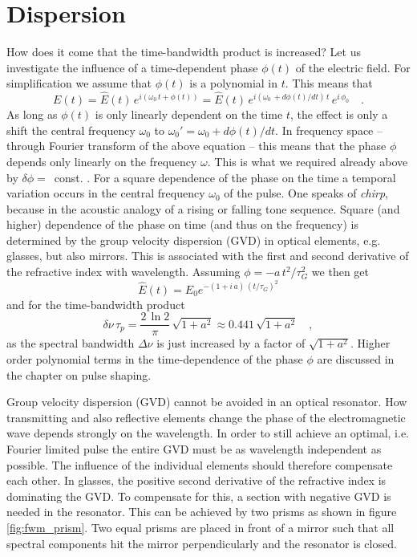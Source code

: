 \section{Dispersion}

How does it come that the time-bandwidth product is increased? 
Let us investigate the  influence of a time-dependent phase $\phi(t)$
of the electric field. For simplification we 
assume that $\phi(t)$ is a polynomial in $t$. This means that
\begin{equation}
  E(t) = \hat{E}(t) \, e^{i ( \omega_0 \, t + \phi(t))}
  = \hat{E}(t) \, e^{i ( \omega_0 \, + d\phi(t)/dt) \, t} \, e^{i
  \, \phi_0}  \quad . \label{eq:fwm_field_with_phase}
\end{equation}
As long as $\phi(t)$ is only linearly dependent on the time $t$, the effect is
 only a shift the central frequency $\omega_0$ to
$\omega_0' = \omega_0 + d\phi(t)/dt$.  In frequency space -- through
Fourier transform of the above equation --  this means that the
phase $\phi$ depends only linearly on the frequency $\omega$. This
is what we required already above by  
$\delta \phi =$~const. . For a square
dependence of the phase on the time a temporal variation occurs
in the central frequency $\omega_0$ of the pulse. One  speaks
of \emph{chirp}, because in the acoustic analogy of a
rising or falling tone sequence. Square
(and higher) dependence of the phase on time (and thus on
the frequency) is determined by the group velocity dispersion
(GVD) in optical elements,
e.g. glasses, but also mirrors. This is associated with the
first and second derivative of the refractive index with 
wavelength. Assuming $\phi = - a \,
t^2 / \tau_G^2$ we then get
\begin{equation}
  \hat{E}(t) = \hat{E}_0 e^{- (1 + i \, a) \, ( t / \tau_G ) ^2} \label{eq:fwm_chirp}
\end{equation}
and for the time-bandwidth product
\begin{equation}
  \delta \nu \, \tau_p = \frac{2 \, \ln 2}{\pi} \, \sqrt{1 + a^2} \approx
  0.441 \, \sqrt{1 + a^2} \quad ,
\end{equation}
as the spectral bandwidth $\Delta \nu$ is just increased by a factor of
$\sqrt{1 + a^2}$. Higher order polynomial terms in the time-dependence of the phase $\phi$ are discussed in the chapter on  pulse shaping.



Group velocity dispersion (GVD) cannot be avoided  in an
optical resonator. How transmitting and
also reflective elements change the phase of the
electromagnetic wave  depends strongly on the wavelength. In order to still achieve an optimal, i.e. Fourier limited pulse
the entire GVD must be as wavelength independent as possible. The influence of the individual elements should therefore 
compensate  each other. In glasses, the positive second derivative of the refractive index
is dominating  the GVD. To compensate for this, a section with
negative GVD is needed in the resonator. This can be  achieved by two prisms as shown in figure
\ref{fig:fwm_prism}. Two equal
prisms are placed in front of a mirror such 
that all spectral components hit the mirror perpendicularly
and  the resonator is closed.  

